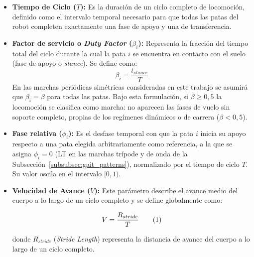 \begin{itemize}
    \item \textbf{Tiempo de Ciclo ($T$):} Es la duración de un ciclo completo de locomoción, definido como el intervalo temporal necesario para que todas las patas del robot completen exactamente una fase de apoyo y una de transferencia.
    
    \item \textbf{Factor de servicio o \textit{Duty Factor} ($\beta_i$):} Representa la fracción del tiempo total del ciclo durante la cual la pata $i$ se encuentra en contacto con el suelo (fase de apoyo o \textit{stance}). Se define como:
    \begin{equation}
        \beta_i = \frac{t_{stance}}{T}
        \label{eq:beta_servicio}
    \end{equation}
    En las marchas periódicas simétricas consideradas en este trabajo se asumirá que $\beta_i=\beta$ para todas las patas. Bajo esta formulación, si $\beta \ge 0{,}5$ la locomoción se clasifica como marcha: no aparecen las fases de vuelo sin soporte completo, propias de los regímenes dinámicos o de carrera ($\beta < 0{,}5$).
    
    \item \textbf{Fase relativa ($\phi_i$):} Es el desfase temporal con que la pata $i$ inicia su apoyo respecto a una pata elegida arbitrariamente como referencia, a la que se asigna $\phi_i=0$ (LT en las marchas trípode y de onda de la Subsección~\ref{subsubsec:gait_patterns}), normalizado por el tiempo de ciclo $T$. Su valor oscila en el intervalo $[0, 1)$.

    \item \textbf{Velocidad de Avance ($V$):} Este parámetro describe el avance medio del cuerpo a lo largo de un ciclo completo y se define globalmente como:

    \noindent
    \begin{minipage}[t]{0.64\linewidth}
        \begin{equation*}
            V = \frac{R_{stride}}{T}
            \refstepcounter{equation}\tag{\theequation}\label{eq:vel_kinematic}
        \end{equation*}
        \par\medskip
        donde $R_{stride}$ (\textit{Stride Length}) representa la distancia de avance del cuerpo a lo largo de un ciclo completo.


\end{minipage}
\end{itemize}

